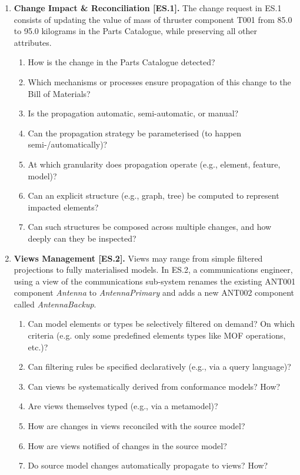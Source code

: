 \documentclass{article}
\begin{document}
\begin{enumerate}[label=\textbf{MT.\arabic*}, leftmargin=*]
\item \textbf{Change Impact \& Reconciliation [ES.1].}  
   The change request in ES.1 consists of updating the value of mass of thruster component \textsf{T001} from \textsf{85.0} to
   \textsf{95.0 kilograms} in the Parts Catalogue, while preserving all other attributes.

   \begin{enumerate}[label=\textbf{\arabic*.}]
      \item How is the change in the Parts Catalogue detected?
      \item Which mechanisms or processes ensure propagation of this change to 
      the Bill of Materials?
      \item Is the propagation automatic, semi-automatic, or manual?
      \item Can the propagation strategy be parameterised (to happen semi-/automatically)?
      \item At which granularity does propagation operate (e.g., element, feature, model)?
      \item Can an explicit structure (e.g., graph, tree) be computed to represent 
      impacted elements?
      \item Can such structures be composed across multiple changes, and how deeply can they be inspected?
   \end{enumerate}

   \item \textbf{Views Management [ES.2].}  
   Views may range from simple filtered projections to fully materialised
   models. In ES.2, a communications engineer, using a view of the communications sub-system renames the existing \textsf{ANT001} component \textit{Antenna} to \textit{AntennaPrimary} and adds a new \textsf{ANT002} component called \textit{AntennaBackup}.

   \begin{enumerate}[label=\textbf{\arabic*.}]
      \item Can model elements or types be selectively filtered on demand? On which
      criteria (e.g. only some predefined elements types like MOF operations, etc.)?
      \item Can filtering rules be specified declaratively (e.g., via a query language)?
      \item Can views be systematically derived from conformance models? How?
      \item Are views themselves typed (e.g., via a metamodel)?
      \item How are changes in views reconciled with the source model?
      \item How are views notified of changes in the source model?
      \item Do source model changes automatically propagate to views? How?
   \end{enumerate}


\end{enumerate}
\end{document}
